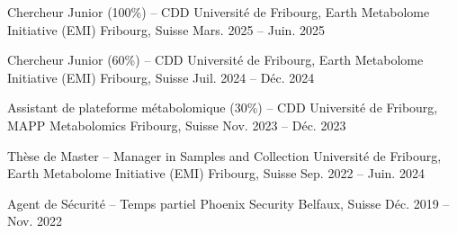 

\begin{cventries}


\cventry
  {Chercheur Junior (100\%) – CDD} %
  {Université de Fribourg, Earth Metabolome Initiative (EMI)} %
  {Fribourg, Suisse} %
  {Mars. 2025 -- Juin. 2025} %
  {}

\cventry
  {Chercheur Junior (60\%) – CDD} %
  {Université de Fribourg, Earth Metabolome Initiative (EMI)} %
  {Fribourg, Suisse} %
  {Juil. 2024 -- Déc. 2024} %
  {}

\cventry
  {Assistant de plateforme métabolomique (30\%) – CDD} %
  {Université de Fribourg, MAPP Metabolomics} %
  {Fribourg, Suisse} %
  {Nov. 2023 -- Déc. 2023} %
  {}

\cventry
  {Thèse de Master – Manager in Samples and Collection} %
  {Université de Fribourg, Earth Metabolome Initiative (EMI)} %
  {Fribourg, Suisse} %
  {Sep. 2022 -- Juin. 2024} %
  {}

\cventry
  {Agent de Sécurité – Temps partiel} %
  {Phoenix Security} %
  {Belfaux, Suisse} %
  {Déc. 2019 -- Nov. 2022} %
  {}

\end{cventries}
